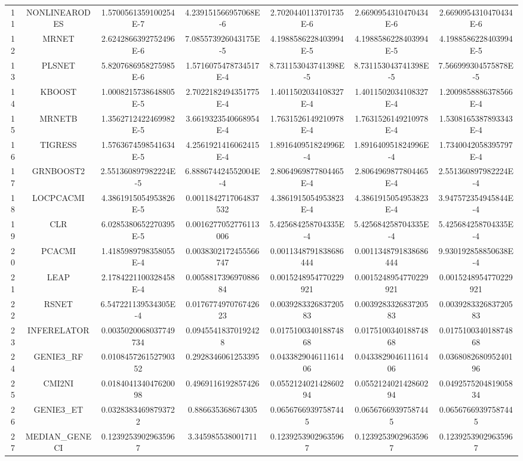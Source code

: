 \documentclass[a4paper,10pt]{article}
\begin{document}
\begin{landscape}
\begin{table}[!htp]
\begin{tabular}{ccccccc}
11&NONLINEARODES&1.5700561359100254E-7&4.239151566957068E-6&2.7020440113701735E-6&2.6690954310470434E-6&2.6690954310470434E-6\\
12&MRNET&2.6242866392752496E-6&7.085573926043175E-5&4.1988586228403994E-5&4.1988586228403994E-5&4.1988586228403994E-5\\
13&PLSNET&5.8207686958275985E-6&1.5716075478734517E-4&8.731153043741398E-5&8.731153043741398E-5&7.566999304575878E-5\\
14&KBOOST&1.0008215738648805E-5&2.7022182494351775E-4&1.4011502034108327E-4&1.4011502034108327E-4&1.2009858886378566E-4\\
15&MRNETB&1.3562712422469982E-5&3.6619323540668954E-4&1.7631526149210978E-4&1.7631526149210978E-4&1.5308165387893343E-4\\
16&TIGRESS&1.5763674598541634E-5&4.2561921416062415E-4&1.891640951824996E-4&1.891640951824996E-4&1.7340042058395797E-4\\
17&GRNBOOST2&2.551360897982224E-5&6.888674424552004E-4&2.8064969877804465E-4&2.8064969877804465E-4&2.551360897982224E-4\\
18&LOCPCACMI&4.3861915054953826E-5&0.0011842717064837532&4.3861915054953823E-4&4.3861915054953823E-4&3.947572354945844E-4\\
19&CLR&6.0285380652270395E-5&0.0016277052776113006&5.425684258704335E-4&5.425684258704335E-4&5.425684258704335E-4\\
20&PCACMI&1.4185989798358055E-4&0.0038302172455566747&0.0011348791838686444&0.0011348791838686444&9.930192858850638E-4\\
21&LEAP&2.1784221100328458E-4&0.005881739697088684&0.0015248954770229921&0.0015248954770229921&0.0015248954770229921\\
22&RSNET&6.547221139534305E-4&0.017677497076742623&0.003928332683720583&0.003928332683720583&0.003928332683720583\\
23&INFERELATOR&0.0035020068037749734&0.09455418370192428&0.017510034018874868&0.017510034018874868&0.017510034018874868\\
24&GENIE3_RF&0.010845726152790352&0.2928346061253395&0.043382904611161406&0.043382904611161406&0.036808268095240196\\
25&CMI2NI&0.018404134047620098&0.4969116192857426&0.055212402142860294&0.055212402142860294&0.049257520481905834\\
26&GENIE3_ET&0.03283834698793722&0.886635368674305&0.06567669397587445&0.06567669397587445&0.06567669397587445\\
27&MEDIAN_GENECI&0.12392539029635967&3.345985538001711&0.12392539029635967&0.12392539029635967&0.12392539029635967\\
\hline
\end{tabular}
\end{table}


\end{landscape}
\end{document}

